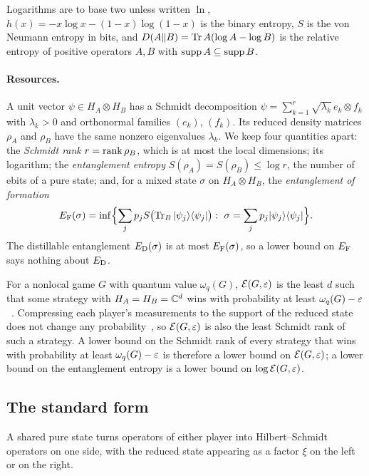 Logarithms are to base two unless written $\ln$, $h(x)=-x\log x-(1-x)\log(1-x)$ is the binary entropy, $S$ is the von
Neumann entropy in bits, and $D(A\|B)=\operatorname{Tr} A(\log A-\log B)$ is the relative entropy of positive operators $A,B$ with
$\operatorname{supp} A\subseteq\operatorname{supp} B$.

\paragraph{Resources.} A unit vector $\psi\in H_A\otimes H_B$ has a Schmidt decomposition
$\psi=\sum_{k=1}^r\sqrt{\lambda_k}\,e_k\otimes f_k$ with $\lambda_k>0$ and orthonormal families $(e_k)$, $(f_k)$. Its
reduced density matrices $\rho_A$ and $\rho_B$ have the same nonzero eigenvalues $\lambda_k$. We keep four quantities
apart: the \emph{Schmidt rank} $r=\operatorname{rank}\rho_B$, which is at most the local dimensions; its logarithm; the
\emph{entanglement entropy} $S(\rho_A)=S(\rho_B)\le\log r$, the number of ebits of a pure state; and, for a mixed state
$\sigma$ on $H_A\otimes H_B$, the \emph{entanglement of formation}~\cite{BDSW96}
\[
\EF(\sigma)=\inf\Bigl\{\sum_jp_jS\bigl(\Tr_B|\psi_j\rangle\langle\psi_j|\bigr):\ \sigma=\sum_jp_j|\psi_j\rangle\langle\psi_j|\Bigr\}.
\]
The distillable entanglement $E_{\mathrm D}(\sigma)$ is at most $E_{\mathrm F}(\sigma)$, so a lower bound on $E_{\mathrm F}$ says nothing about $E_{\mathrm D}$.

For a nonlocal game $G$ with quantum value $\omega_q(G)$, $\mathcal E(G,\varepsilon)$ is the least $d$ such that some strategy with
$H_A=H_B=\mathbb C^d$ wins with probability at least $\omega_q(G)-\varepsilon$~\cite{SV18}. Compressing each player's measurements to
the support of the reduced state does not change any probability~\cite[Remark~2.9]{DM-game}, so $\mathcal E(G,\varepsilon)$ is also
the least Schmidt rank of such a strategy. A lower bound on the Schmidt rank of every strategy that wins with
probability at least $\omega_q(G)-\varepsilon$ is therefore a lower bound on $\mathcal E(G,\varepsilon)$; a lower bound on the entanglement
entropy is a lower bound on $\log\mathcal E(G,\varepsilon)$.

\subsection{The standard form}\label{sec:prelim-standard}

A shared pure state turns operators of either player into Hilbert--Schmidt operators on one side, with the reduced
state appearing as a factor $\xi$ on the left or on the right.

